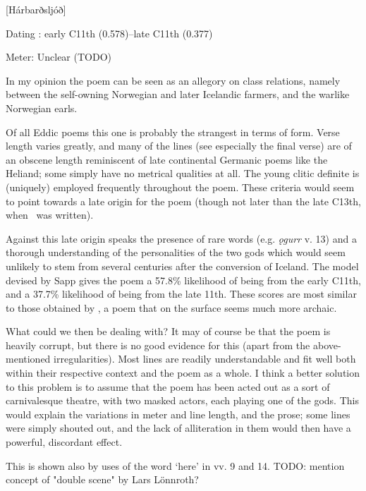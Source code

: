 [Hárbarðsljóð]

\begin{flushright}%
Dating \parencite{Sapp2022}: early C11th (0.578)–late C11th (0.377)

Meter: Unclear (TODO)%
\end{flushright}

In my opinion the poem can be seen as an allegory on class relations, namely between the self-owning Norwegian and later Icelandic farmers, and the warlike Norwegian earls.

Of all Eddic poems this one is probably the strangest in terms of form. Verse length varies greatly, and many of the lines (see especially the final verse) are of an obscene length reminiscent of late continental Germanic poems like the Heliand; some simply have no metrical qualities at all. The young clitic definite is (uniquely) employed frequently throughout the poem. These criteria would seem to point towards a late origin for the poem (though not later than the late C13th, when \Regius\ was written).

Against this late origin speaks the presence of rare words (e.g. \emph{ǫgurr} v. 13) and a thorough understanding of the personalities of the two gods which would seem unlikely to stem from several centuries after the conversion of Iceland. The model devised by Sapp gives the poem a 57.8\% likelihood of being from the early C11th, and a 37.7\% likelihood of being from the late 11th. These scores are most similar to those obtained by \Gripisspa, a poem that on the surface seems much more archaic.

What could we then be dealing with? It may of course be that the poem is heavily corrupt, but there is no good evidence for this (apart from the above-mentioned irregularities). Most lines are readily understandable and fit well both within their respective context and the poem as a whole. I think a better solution to this problem is to assume that the poem has been acted out as a sort of carnivalesque theatre, with two masked actors, each playing one of the gods. This would explain the variations in meter and line length, and the prose; some lines were simply shouted out, and the lack of alliteration in them would then have a powerful, discordant effect.

This is shown also by uses of the word ‘here’ in vv. 9 and 14. TODO: mention concept of "double scene" by Lars Lönnroth?


\sectionline


